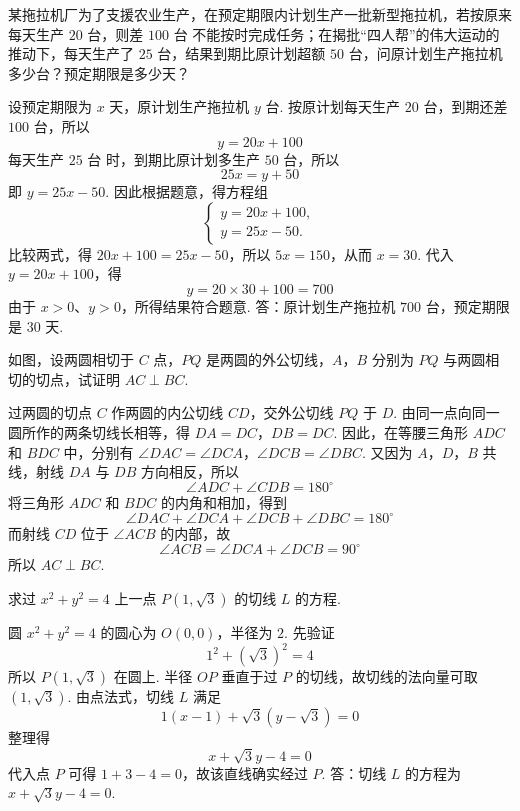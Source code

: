 \begin{problem}
某拖拉机厂为了支援农业生产，在预定期限内计划生产一批新型拖拉机，若按原来每天生产 \(20\text{~台}\)，则差 \(100\text{~台}\) 不能按时完成任务；在揭批“四人帮”的伟大运动的推动下，每天生产了 \(25\text{~台}\)，结果到期比原计划超额 \(50\text{~台}\)，问原计划生产拖拉机多少台？预定期限是多少天？
\end{problem}

\begin{solution}
设预定期限为 \(x\text{~天}\)，原计划生产拖拉机 \(y\text{~台}\). 按原计划每天生产 \(20\text{~台}\)，到期还差 \(100\text{~台}\)，所以
\[
y=20x+100
\]
每天生产 \(25\text{~台}\) 时，到期比原计划多生产 \(50\text{~台}\)，所以
\[
25x=y+50
\]
即 \(y=25x-50\). 因此根据题意，得方程组
\[
\begin{cases}
y=20x+100,\\
y=25x-50.
\end{cases}
\]
比较两式，得 \(20x+100=25x-50\)，所以 \(5x=150\)，从而 \(x=30\). 代入 \(y=20x+100\)，得
\[
y=20\times30+100=700
\]
由于 \(x>0\)、\(y>0\)，所得结果符合题意. 答：原计划生产拖拉机 \(700\text{~台}\)，预定期限是 \(30\text{~天}\).
\end{solution}

\begin{problem}
如图，设两圆相切于 \(C\) 点，\(PQ\) 是两圆的外公切线，\(A\)，\(B\) 分别为 \(PQ\) 与两圆相切的切点，试证明 \(AC\perp BC\).

\end{problem}

\begin{solution}
过两圆的切点 \(C\) 作两圆的内公切线 \(CD\)，交外公切线 \(PQ\) 于 \(D\). 由同一点向同一圆所作的两条切线长相等，得
\(DA=DC\)，\(DB=DC\).
因此，在等腰三角形 \(ADC\) 和 \(BDC\) 中，分别有
\(\angle DAC=\angle DCA\)，\(\angle DCB=\angle DBC\).
又因为 \(A\)，\(D\)，\(B\) 共线，射线 \(DA\) 与 \(DB\) 方向相反，所以
\[
\angle ADC+\angle CDB=180^\circ
\]
将三角形 \(ADC\) 和 \(BDC\) 的内角和相加，得到
\[
\angle DAC+\angle DCA+\angle DCB+\angle DBC=180^\circ
\]
而射线 \(CD\) 位于 \(\angle ACB\) 的内部，故
\[
\angle ACB=\angle DCA+\angle DCB=90^\circ
\]
所以 \(AC\perp BC\).
\end{solution}

\begin{problem}
求过 \(x^2+y^2=4\) 上一点 \(P\left(1,\sqrt{3}\right)\) 的切线 \(L\) 的方程.
\end{problem}

\begin{solution}
圆 \(x^2+y^2=4\) 的圆心为 \(O\left(0,0\right)\)，半径为 \(2\). 先验证
\[
1^2+\left(\sqrt{3}\right)^2=4
\]
所以 \(P\left(1,\sqrt{3}\right)\) 在圆上. 半径 \(OP\) 垂直于过 \(P\) 的切线，故切线的法向量可取 \(\left(1,\sqrt{3}\right)\). 由点法式，切线 \(L\) 满足
\[
1\left(x-1\right)+\sqrt{3}\left(y-\sqrt{3}\right)=0
\]
整理得
\[
x+\sqrt{3}y-4=0
\]
代入点 \(P\) 可得 \(1+3-4=0\)，故该直线确实经过 \(P\). 答：切线 \(L\) 的方程为 \(x+\sqrt{3}y-4=0\).
\end{solution}

